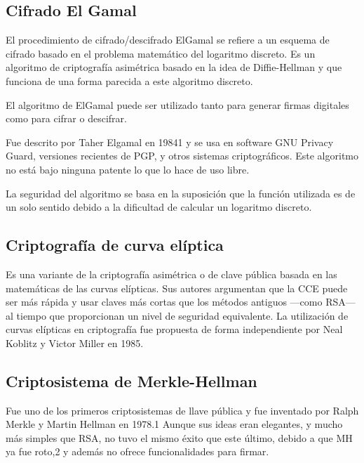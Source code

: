 \documentclass[a4paper]{article}
\begin{document}
\par


\vspace{\baselineskip}
\subsection{Cifrado El Gamal}
El procedimiento de cifrado/descifrado ElGamal se refiere a un esquema de cifrado basado en el problema matemático del logaritmo discreto. Es un algoritmo de criptografía asimétrica basado en la idea de Diffie-Hellman y que funciona de una forma parecida a este algoritmo discreto.\par

El algoritmo de ElGamal puede ser utilizado tanto para generar firmas digitales como para cifrar o descifrar.\par

Fue descrito por Taher Elgamal en 19841​ y se usa en software GNU Privacy Guard, versiones recientes de PGP, y otros sistemas criptográficos. Este algoritmo no está bajo ninguna patente lo que lo hace de uso libre.\par

La seguridad del algoritmo se basa en la suposición que la función utilizada es de un solo sentido debido a la dificultad de calcular un logaritmo discreto.\par

\par

\subsection{Criptografía de curva elíptica}
Es una variante de la criptografía asimétrica o de clave pública basada en las matemáticas de las curvas elípticas. Sus autores argumentan que la CCE puede ser más rápida y usar claves más cortas que los métodos antiguos —como RSA— al tiempo que proporcionan un nivel de seguridad equivalente. La utilización de curvas elípticas en criptografía fue propuesta de forma independiente por Neal Koblitz y Victor Miller en 1985.\par

\par


\vspace{\baselineskip}
\par

\subsection{Criptosistema de Merkle-Hellman}
Fue uno de los primeros criptosistemas de llave pública y fue inventado por Ralph Merkle y Martin Hellman en 1978.1​ Aunque sus ideas eran elegantes, y mucho más simples que RSA, no tuvo el mismo éxito que este último, debido a que MH ya fue roto,2​ y además no ofrece funcionalidades para firmar.\par
\end{document}
